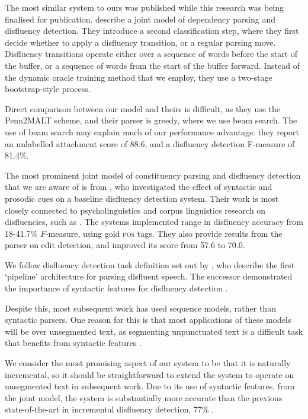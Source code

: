 \documentclass[11pt,letterpaper]{article}
\begin{document}
The most similar system to ours was published while this research was being
finalised for publication. \citet{rasooli:13} describe a joint model of dependency
parsing and disfluency detection. They introduce a second classification step,
where they first decide whether to apply a disfluency transition, or a regular
parsing move. Disfluency transitions operate either over a sequence of words
before the start of the buffer, or a sequence of words from the start of the
buffer forward. Instead of the dynamic oracle training method that we employ,
they use a two-stage bootstrap-style process.

Direct comparison between our model and theirs is difficult,
as they use the Penn2MALT scheme, and their parser is greedy, where we use
beam search. The use of beam search may explain much of our performance advantage:
they report an unlabelled attachment score of 88.6, and a disfluency detection
F-measure of 81.4\%.

The most prominent joint model of constituency parsing and disfluency detection
that we are aware of is from \citet{hale:06}, who investigated the effect of
syntactic and prosodic cues on a baseline disfluency detection system.  Their
work is most closely connected to psycholinguistics and corpus linguistics research
on disfluencies, such as \citet{shriberg:98}. The systems \citeauthor{hale:06}
implemented range in disfluency accuracy from
18-41.7\% $F$-measure, using gold \textsc{pos} tags. They also provide results
from the  \citet{Charniak01a} parser on edit detection, and improved its score
from 57.6 to 70.0.

We follow disfluency detection task definition set out by 
\citet{Charniak01b}, who describe the first `pipeline' architecture for parsing
disfluent speech.  The successor
demonstrated the importance of syntactic features for disfluency detection
\citep{Johnson04a}.

Despite this, most subsequent work has used sequence models, rather than syntactic
parsers.  One reason for this is that most applications of these models will be
over unsegmented text, as segmenting unpunctuated text
is a difficult task that benefits from syntactic features \citep{zhang:13}.

We consider the most promising aspect of our system to be that it is naturally
incremental, so it should be straightforward to extend the system to operate
on unsegmented text in subsequent work.  Due to its use of syntactic features,
from the joint model, the system is substantially more accurate than the previous
state-of-the-art in incremental disfluency detection, 77\% \citep{zwarts:10}.
\end{document}
